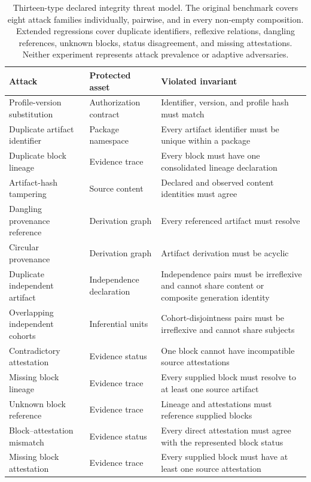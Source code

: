 \begin{table}[!htbp]
\centering
\caption{Thirteen-type declared integrity threat model. The original benchmark covers eight attack families individually, pairwise, and in every non-empty composition. Extended regressions cover duplicate identifiers, reflexive relations, dangling references, unknown blocks, status disagreement, and missing attestations. Neither experiment represents attack prevalence or adaptive adversaries.}
\label{tab:integrity-threat-model}
\scriptsize
\renewcommand{\arraystretch}{1.06}
\begin{tabularx}{\textwidth}{@{}P{0.27\textwidth}P{0.20\textwidth}Y@{}}
\toprule
Attack & Protected asset & Violated invariant \\
\midrule
Profile-version substitution & Authorization contract & Identifier, version, and profile hash must match \\
Duplicate artifact identifier & Package namespace & Every artifact identifier must be unique within a package \\
Duplicate block lineage & Evidence trace & Every block must have one consolidated lineage declaration \\
Artifact-hash tampering & Source content & Declared and observed content identities must agree \\
Dangling provenance reference & Derivation graph & Every referenced artifact must resolve \\
Circular provenance & Derivation graph & Artifact derivation must be acyclic \\
Duplicate independent artifact & Independence declaration & Independence pairs must be irreflexive and cannot share content or composite generation identity \\
Overlapping independent cohorts & Inferential units & Cohort-disjointness pairs must be irreflexive and cannot share subjects \\
Contradictory attestation & Evidence status & One block cannot have incompatible source attestations \\
Missing block lineage & Evidence trace & Every supplied block must resolve to at least one source artifact \\
Unknown block reference & Evidence trace & Lineage and attestations must reference supplied blocks \\
Block--attestation mismatch & Evidence status & Every direct attestation must agree with the represented block status \\
Missing block attestation & Evidence trace & Every supplied block must have at least one source attestation \\
\bottomrule
\end{tabularx}
\end{table}
